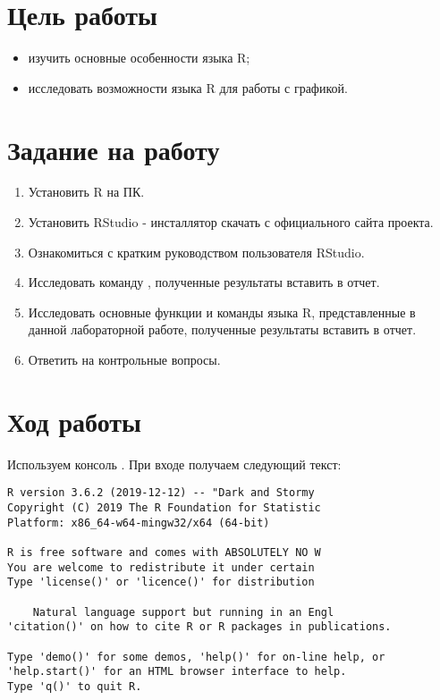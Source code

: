 \documentclass[a4paper,14pt]{extarticle}
\begin{document}


\section{Цель работы}
\begin{itemize}
    \item изучить основные особенности языка R;
    \item исследовать возможности языка R для работы с графикой.
\end{itemize}

\section{Задание на работу}
\begin{enumerate}
    \item Установить R на ПК.
    \item Установить RStudio - инсталлятор скачать с официального сайта проекта.
    \item Ознакомиться с кратким руководством пользователя RStudio.
    \item Исследовать команду , полученные результаты вставить в отчет.
    \item Исследовать основные функции и команды языка R, представленные в данной
          лабораторной работе, полученные результаты вставить в отчет.
    \item Ответить на контрольные вопросы.
\end{enumerate}

\section{Ход работы}
Используем консоль . При входе получаем следующий текст:

\begin{lstlisting}
R version 3.6.2 (2019-12-12) -- "Dark and Stormy 
Copyright (C) 2019 The R Foundation for Statistic
Platform: x86_64-w64-mingw32/x64 (64-bit)

R is free software and comes with ABSOLUTELY NO W
You are welcome to redistribute it under certain 
Type 'license()' or 'licence()' for distribution 

    Natural language support but running in an Engl
'citation()' on how to cite R or R packages in publications.

Type 'demo()' for some demos, 'help()' for on-line help, or
'help.start()' for an HTML browser interface to help.
Type 'q()' to quit R.
\end{lstlisting}
\end{document}
